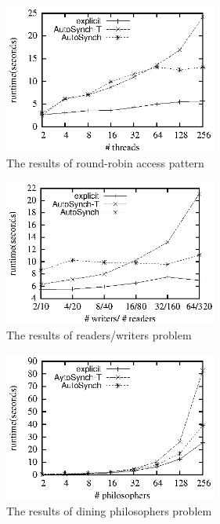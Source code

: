 \documentclass[preprint]{sigplanconf}
\begin{document}
\begin{figure}[ht!]
  \centering
  \includegraphics[width=70mm]{fig/rr.eps}
  \caption{The results of round-robin access pattern}
  \label{fig:rr_eval}
\end{figure}

\begin{figure}[ht!]
  \centering
  \includegraphics[width=70mm]{fig/trw.eps}
  \caption{The results of readers/writers problem}
  \label{fig:rw_eval}
\end{figure}


\begin{figure}[ht!]
  \centering
  \includegraphics[width=70mm]{fig/dp.eps}
  \caption{The results of dining philosophers problem}
  \label{fig:dp_eval}
\end{figure}
\end{document}
